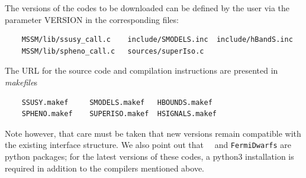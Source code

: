 \documentclass[12pt,a4paper]{article}
\begin{document}
  \vspace{0.8cm}
The versions of the codes to be downloaded can be defined by the user  via the parameter
VERSION  in the corresponding files:
\begin{verbatim}
    MSSM/lib/ssusy_call.c    include/SMODELS.inc  include/hBandS.inc
    MSSM/lib/spheno_call.c   sources/superIso.c                       
\end{verbatim}
The URL for the source  code and compilation instructions are presented in {\it makefile}s
\begin{verbatim} 
    SSUSY.makef     SMODELS.makef   HBOUNDS.makef     
    SPHENO.makef    SUPERISO.makef  HSIGNALS.makef
\end{verbatim}
Note however, that care must be taken that new versions remain compatible with the existing interface structure.
We also point out that \lilith\, \smodels\ and {\tt FermiDwarfs} are python packages; for the latest versions of these codes, a
python3 installation is required in addition to the compilers mentioned above.

\end{document}
